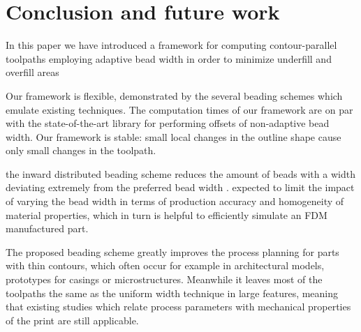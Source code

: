 \section{Conclusion and future work}
In this paper we have introduced a framework for computing contour-parallel toolpaths employing adaptive bead width in order to minimize underfill and overfill areas

Our framework is flexible, demonstrated by the several beading schemes which emulate existing techniques.
The computation times of our framework are on par with the state-of-the-art library for performing offsets of non-adaptive bead width.
Our framework is stable: small local changes in the outline shape cause only small changes in the toolpath.

 the inward distributed beading scheme
 reduces the amount of beads with a width deviating extremely from the preferred bead width .
 expected to limit the impact of varying the bead width in terms of production accuracy and homogeneity of material properties,
which in turn is helpful to efficiently simulate an FDM manufactured part.

The proposed beading scheme greatly improves the process planning for parts with thin contours, which often occur for example in architectural models, prototypes for casings or microstructures.
Meanwhile it leaves most of the toolpaths the same as the uniform width technique in large features, meaning that existing studies which relate process parameters with mechanical properties of the print are still applicable.


